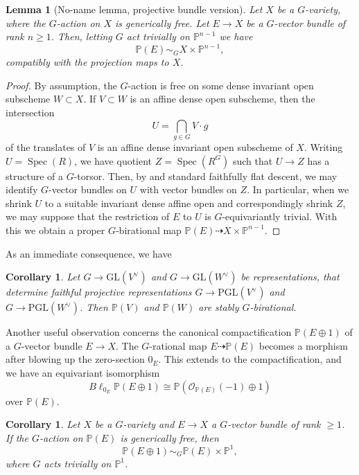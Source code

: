\documentclass[12pt,reqno]{amsart}
\theoremstyle{plain}
\newtheorem{coro}[prop]{Corollary}
\newtheorem{lemm}[prop]{Lemma}
\theoremstyle{remark}
\theoremstyle{definition}
\numberwithin{equation}{section}
\newcommand{\bP}{{\mathbb P}}
\newcommand{\cO}{{\mathcal O}}
\newcommand{\GL}{{\mathrm{GL}}}
\newcommand{\PGL}{{\mathrm{PGL}}}
\DeclareMathOperator{\Spec}{Spec}
\begin{document}
\begin{lemm}[No-name lemma, projective bundle version]
\label{lemm:non-name}
Let $X$ be a $G$-variety, where
the $G$-action on $X$ is generically free.
Let $E\to X$ be a $G$-vector bundle of rank $n\ge 1$.
Then, letting $G$ act trivially on $\bP^{n-1}$ we have
$$
\bP(E) \sim_G X\times \bP^{n-1},
$$
compatibly with the projection maps to $X$.
\end{lemm}

\begin{proof}
By assumption,
the $G$-action is free on some dense invariant open subscheme $W\subset X$.
If $V\subset W$ is an affine dense open subscheme, then the intersection
\[
U=\bigcap_{g\in G} V\cdot g
\]
of the translates of $V$ is an affine dense invariant open subscheme of $X$.
Writing $U=\Spec(R)$, we have quotient $Z=\Spec(R^G)$ such that
$U\to Z$ has a structure of a $G$-torsor. Then, by \cite[Prop.\ 0.9, Ampfl.\ 1.3]{mumford-git} and standard faithfully flat descent, we may identify $G$-vector bundles on $U$
with vector bundles on $Z$.
In particular, when we shrink $U$ to a suitable invariant dense affine open and correspondingly shrink $Z$, we may suppose that the restriction of $E$ to $U$ is $G$-equivariantly trivial.
With this we obtain a proper $G$-birational map $\bP(E)\dashrightarrow X\times \bP^{n-1}$.
\end{proof}


As an immediate consequence, we have

\begin{coro}
\label{coro:no-name}
Let $G\to \GL(V^\vee)$ and $G\to \GL(W^\vee)$ be representations, that determine faithful
projective representations $G\to \PGL(V^\vee)$ and $G\to \PGL(W^\vee)$.
Then $\bP(V)$ and $\bP(W)$ are stably $G$-birational.
\end{coro}

Another useful observation concerns the canonical compactification $\bP(E\oplus 1)$ of a $G$-vector bundle $E\to X$.
The $G$-rational map $E\dashrightarrow \bP(E)$ becomes a morphism after
blowing up the zero-section $0_E$.
This extends to the compactification, and we have
an equivariant isomorphism
\[ B\ell_{0_E}\bP(E\oplus 1)\cong \bP(\cO_{\bP(E)}(-1)\oplus 1) \]
over $\bP(E)$.

\begin{coro}
\label{coro:no-name2}
Let $X$ be a $G$-variety and $E\to X$ a $G$-vector bundle of rank $\ge 1$.
If the $G$-action on $\bP(E)$ is generically free, then
\[ \bP(E\oplus 1)\sim_G \bP(E)\times \bP^1, \]
where $G$ acts trivially on $\bP^1$.
\end{coro}
\end{document}
